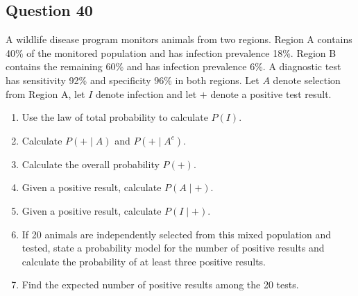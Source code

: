 \documentclass[10pt,letterpaper]{article}
\newcommand{\questionheading}[1]{%
  \subsection*{Question #1}
}
\begin{document}
\newpage

\questionheading{40}
A wildlife disease program monitors animals from two regions. Region A contains 40\% of the monitored population and has infection prevalence 18\%. Region B contains the remaining 60\% and has infection prevalence 6\%. A diagnostic test has sensitivity 92\% and specificity 96\% in both regions. Let $A$ denote selection from Region A, let $I$ denote infection and let $+$ denote a positive test result.
\begin{enumerate}
	\item Use the law of total probability to calculate $P(I)$.
	\item Calculate $P(+\mid A)$ and $P(+\mid A^c)$.
	\item Calculate the overall probability $P(+)$.
	\item Given a positive result, calculate $P(A\mid +)$.
	\item Given a positive result, calculate $P(I\mid +)$.
	\item If 20 animals are independently selected from this mixed population and tested, state a probability model for the number of positive results and calculate the probability of at least three positive results.
	\item Find the expected number of positive results among the 20 tests.
\end{enumerate}
\end{document}
